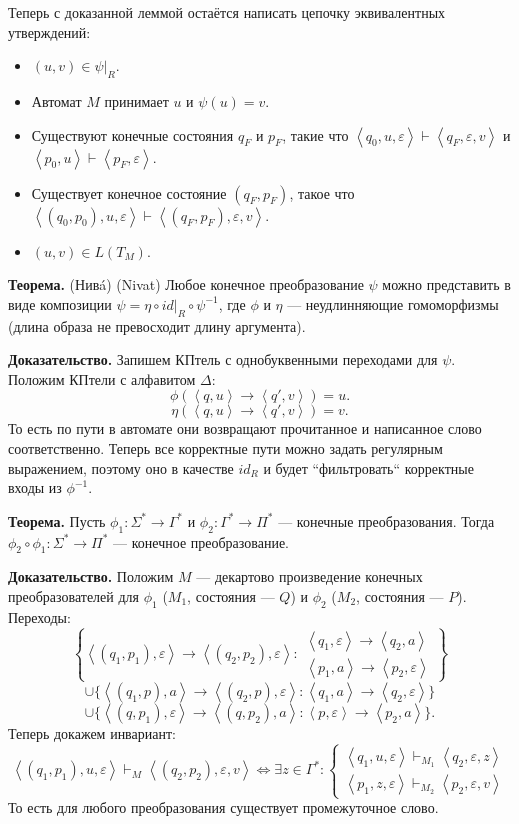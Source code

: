 Теперь с доказанной леммой остаётся написать цепочку эквивалентных утверждений:
\begin{itemize}
    \item $(u, v) \in \psi|_R$.
    \item Автомат $M$ принимает $u$ и $\psi(u) = v$.
    \item Существуют конечные состояния $q_F$ и $p_F$, такие что $\left<q_0, u, \varepsilon \right> \vdash \left<q_F, \varepsilon, v \right>$ и $\left<p_0, u \right> \vdash \left<p_F, \varepsilon \right>$.
    \item Существует конечное состояние $(q_F, p_F)$, такое что $\left<(q_0, p_0), u, \varepsilon \right> \vdash \left<(q_F, p_F), \varepsilon, v \right>$.
    \item $(u, v) \in L(T_M)$.
\end{itemize}

\QED

\textbf{Теорема.} (Нивá) (Nivat) Любое конечное преобразование $\psi$ можно представить в виде композиции $\psi = \eta \circ id|_R \circ \psi^{-1}$, где $\phi$ и $\eta$ --- неудлинняющие гомоморфизмы (длина образа не превосходит длину аргумента).

\textbf{Доказательство.} Запишем КПтель с однобуквенными переходами для $\psi$.
Положим КПтели с алфавитом $\Delta$:
\[
    \phi(\left< q, u \right> \to \left< q', v \right>) = u.
\]
\[
    \eta(\left< q, u \right> \to \left< q', v \right>) = v.
\]
То есть по пути в автомате они возвращают прочитанное и написанное слово соответственно.
Теперь все корректные пути можно задать регулярным выражением, поэтому оно в качестве $id_R$ и будет ``фильтровать`` корректные входы из $\phi^{-1}$.

\textbf{Теорема.} Пусть $\phi_1: \Sigma^* \to \Gamma^*$ и $\phi_2: \Gamma^* \to \Pi^*$ --- конечные преобразования.
Тогда $\phi_2 \circ \phi_1: \Sigma^* \to \Pi^*$ --- конечное преобразование.

\textbf{Доказательство.} Положим $M$ --- декартово произведение конечных преобразователей для $\phi_1$ ($M_1$, состояния --- $Q$) и $\phi_2$ ($M_2$, состояния --- $P$).
Переходы:
\[
    \left\{ \left<(q_1, p_1), \varepsilon \right> \to \left<(q_2, p_2), \varepsilon \right>: \substack{\left<q_1, \varepsilon \right> \to \left< q_2, a \right> \\ \left<p_1, a \right> \to \left< p_2, \varepsilon \right>} \right\}
\]
\[
    \cup \{ \left< (q_1, p), a \right> \to \left<(q_2, p), \varepsilon \right>: \left<q_1, a \right> \to \left<q_2, \varepsilon \right>\}
\]
\[
    \cup \{\left<(q, p_1), \varepsilon \right> \to \left<(q, p_2), a \right>: \left<p, \varepsilon \right> \to \left< p_2, a \right>\}.
\]
Теперь докажем инвариант:
\[
    \left<(q_1, p_1), u, \varepsilon \right> \vdash_M \left<(q_2, p_2), \varepsilon, v\right> \iff \exists z \in \Gamma^*:
    \begin{cases}
        \left<q_1, u, \varepsilon \right> \vdash_{M_1} \left< q_2, \varepsilon, z \right> \\
        \left<p_1, z, \varepsilon \right> \vdash_{M_2} \left< p_2, \varepsilon, v \right>
    \end{cases}
\]
То есть для любого преобразования существует промежуточное слово.

